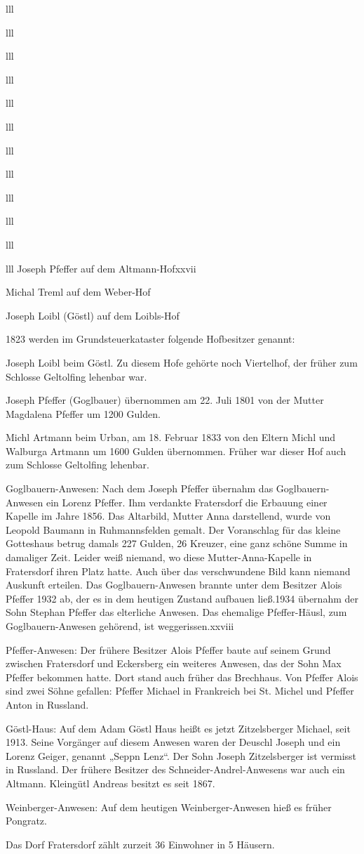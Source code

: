\documentclass[12pt,a4pager]{book}
\begin{document}
\begin{tabuluar}{lll}
\begin{tabuluar}{lll}
\begin{tabuluar}{lll}
\begin{tabuluar}{lll}
\begin{tabuluar}{lll}
\begin{tabuluar}{lll}
\begin{tabuluar}{lll}
\begin{tabuluar}{lll}
\begin{tabuluar}{lll}
\begin{tabuluar}{lll}
\begin{tabuluar}{lll}
\begin{tabuluar}{lll}
Joseph Pfeffer auf dem Altmann-Hofxxvii

Michal Treml auf dem Weber-Hof

Joseph Loibl (Göstl) auf dem Loibls-Hof

1823 werden im Grundsteuerkataster folgende Hofbesitzer genannt:

Joseph Loibl beim Göstl. Zu diesem Hofe gehörte noch Viertelhof, der früher zum
Schlosse Geltolfing lehenbar war.

Joseph Pfeffer (Goglbauer) übernommen am 22. Juli 1801 von der Mutter Magdalena
Pfeffer um 1200 Gulden.

Michl Artmann beim Urban, am 18. Februar 1833 von den Eltern Michl und Walburga
Artmann um 1600 Gulden übernommen. Früher war dieser Hof auch zum Schlosse
Geltolfing lehenbar.

Goglbauern-Anwesen: Nach dem Joseph Pfeffer übernahm das Goglbauern-Anwesen ein
Lorenz Pfeffer. Ihm verdankte Fratersdorf die Erbauung einer Kapelle im Jahre
1856. Das Altarbild, Mutter Anna darstellend, wurde von Leopold Baumann in
Ruhmannsfelden gemalt. Der Voranschlag für das kleine Gotteshaus betrug damals
227 Gulden, 26 Kreuzer, eine ganz schöne Summe in damaliger Zeit. Leider weiß
niemand, wo diese Mutter-Anna-Kapelle in Fratersdorf ihren Platz hatte. Auch
über das verschwundene Bild kann niemand Auskunft erteilen. Das
Goglbauern-Anwesen brannte unter dem Besitzer Alois Pfeffer 1932 ab, der es in
dem heutigen Zustand aufbauen ließ.1934 übernahm der Sohn Stephan Pfeffer das
elterliche Anwesen. Das ehemalige Pfeffer-Häusl, zum Goglbauern-Anwesen
gehörend, ist weggerissen.xxviii

Pfeffer-Anwesen: Der frühere Besitzer Alois Pfeffer baute auf seinem Grund
zwischen Fratersdorf und Eckersberg ein weiteres Anwesen, das der Sohn Max
Pfeffer bekommen hatte. Dort stand auch früher das Brechhaus. Von Pfeffer Alois
sind zwei Söhne gefallen: Pfeffer Michael in Frankreich bei St. Michel und
Pfeffer Anton in Russland.

Göstl-Haus: Auf dem Adam Göstl Haus heißt es jetzt Zitzelsberger Michael, seit
1913. Seine Vorgänger auf diesem Anwesen waren der Deuschl Joseph und ein Lorenz
Geiger, genannt „Seppn Lenz“. Der Sohn Joseph Zitzelsberger ist vermisst in
Russland. Der frühere Besitzer des Schneider-Andrel-Anwesens war auch ein
Altmann. Kleingütl Andreas besitzt es seit 1867.

Weinberger-Anwesen: Auf dem heutigen Weinberger-Anwesen hieß es früher Pongratz.

Das Dorf Fratersdorf zählt zurzeit 36 Einwohner in 5 Häusern.


\end{tabuluar}
\end{tabuluar}
\end{tabuluar}
\end{tabuluar}
\end{tabuluar}
\end{tabuluar}
\end{tabuluar}
\end{tabuluar}
\end{tabuluar}
\end{tabuluar}
\end{tabuluar}
\end{tabuluar}
\end{document}
